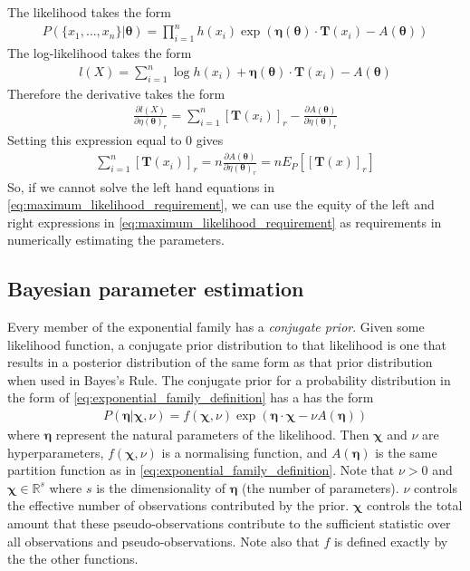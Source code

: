 \documentclass[a4paper,12pt]{article}
\theoremstyle{definition}
\newcommand{\pdiff}[2]{\frac{\partial #1}{\partial #2}} %
\begin{document}
The likelihood takes the form 
\begin{align}\label{eq:exponential_family_likelihood}
  P(\lbrace x_1, \dots, x_n \rbrace | \boldsymbol{\theta}) = \prod_{i=1}^n h(x_i) \exp \left( \boldsymbol{\eta}(\boldsymbol{\theta})\cdot \mathbf{T}(x_i) - A(\boldsymbol{\theta}) \right)
\end{align}
The log-likelihood takes the form
\begin{align}
  l(X) = \sum_{i=1}^n \log h(x_i) + \boldsymbol{\eta}(\boldsymbol{\theta})\cdot \mathbf{T}(x_i) - A(\boldsymbol{\theta})
\end{align}
Therefore the derivative takes the form 
\begin{align}
  \pdiff{l(X)}{\eta (\boldsymbol{\theta})_r} = \sum_{i=1}^n \left[ \mathbf{T}(x_i) \right]_r - \pdiff{A(\boldsymbol{\theta})}{\eta(\boldsymbol{\theta})_r}
\end{align}
Setting this expression equal to $0$ gives 
\begin{align}\label{eq:maximum_likelihood_requirement}
  \sum_{i=1}^n \left[ \mathbf{T}(x_i) \right]_r = n\pdiff{A(\boldsymbol{\theta})}{\eta(\boldsymbol{\theta})_r} = n E_P \left[ [\mathbf{T}(x)]_r \right]
\end{align}
So, if we cannot solve the left hand equations in \ref{eq:maximum_likelihood_requirement}, we can use the equity of the left and right expressions in \ref{eq:maximum_likelihood_requirement} as requirements in numerically estimating the parameters.

\subsection{Bayesian parameter estimation}\label{sec:bayesian_parameter_estimation}
Every member of the exponential family has a \textit{conjugate prior}. Given some likelihood function, a conjugate prior distribution to that likelihood is one that results in a posterior distribution of the same form as that prior distribution when used in Bayes's Rule. The conjugate prior for a probability distribution  in the form of \ref{eq:exponential_family_definition} has a has the form 
\begin{align}\label{eq:exponential_family_prior}
  P(\boldsymbol{\eta} | \boldsymbol{\chi}, \nu) = f(\boldsymbol{\chi}, \nu)\exp (\boldsymbol{\eta} \cdot \boldsymbol{\chi} - \nu A(\boldsymbol{\eta}))
\end{align}
where $\boldsymbol{\eta}$ represent the natural parameters of the likelihood. Then $\boldsymbol{\chi}$ and $\nu$ are hyperparameters, $f(\boldsymbol{\chi}, \nu)$ is a normalising function, and $A(\boldsymbol{\eta})$ is the same partition function as in \ref{eq:exponential_family_definition}. Note that $\nu > 0$ and $\boldsymbol{\chi} \in \mathbb{R}^s$ where $s$ is the dimensionality of $\boldsymbol{\eta}$ (the number of parameters). $\nu$ controls the effective number of observations contributed by the prior. $\boldsymbol{\chi}$ controls the total amount that these pseudo-observations contribute to the sufficient statistic over all observations and pseudo-observations. Note also that $f$ is defined exactly by the the other functions.
\end{document}
